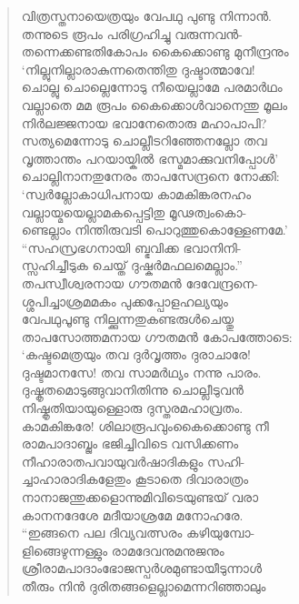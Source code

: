 \begin{verse}
വിത്രസ്തനായെത്രയും വേപഥു പുണ്ടു നിന്നാന്‍.\\
തന്നുടെ രൂപം പരിഗ്രഹിച്ചു വരുന്നവന്‍-\\
തന്നെക്കണ്ടതികോപം കൈക്കൊണ്ടു മുനീന്ദ്രനും\\
‘നില്ലുനില്ലാരാകുന്നതെന്തിതു ദുഷ്ടാത്മാവേ!\\
ചൊല്ലു ചൊല്ലെന്നോടു നീയെല്ലാമേ പരമാര്‍ഥം\\
വല്ലാതെ മമ രൂപം കൈക്കൊള്‍വാനെന്തു മൂലം\\
നിര്‍ലജ്ജനായ ഭവാനേതൊരു മഹാപാപി?\\
സത്യമെന്നോടു ചൊല്ലീടറിഞ്ഞേനല്ലോ തവ\\
വൃത്താന്തം പറയായ്കില്‍ ഭസ്മമാക്കുവനിപ്പോള്‍’\\
ചൊല്ലിനാനതുനേരം താപസേന്ദ്രനെ നോക്കി:\\
‘സ്വര്‍ല്ലോകാധിപനായ കാമകിങ്കരനഹം\\
വല്ലായ്മയെല്ലാമകപ്പെട്ടിതു മൂഢത്വംകൊ-\\
ണ്ടെല്ലാം നിന്തിരുവടി പൊറുത്തുകൊള്ളേണമേ.’\\
“സഹസ്രഭഗനായി ബ്ഭവിക്ക ഭവാനിനി-\\
സ്സഹിച്ചീടുക ചെയ്ത് ദുഷ്കര്‍മഫലമെല്ലാം.”\\
തപസ്വീശ്വരനായ ഗൗതമന്‍ ദേവേന്ദ്രനെ-\\
ശ്ശപിച്ചാശ്രമമകം പുക്കപ്പോളഹല്യയും\\
വേപഥുപൂണ്ടു നില്ക്കുന്നതുകണ്ടരുള്‍ചെയ്തു\\
താപസോത്തമനായ ഗൗതമന്‍ കോപത്തോടെ:\\
‘കഷ്ടമെത്രയും തവ ദുര്‍വൃത്തം ദുരാചാരേ!\\
ദുഷ്ടമാനസേ! തവ സാമര്‍ഥ്യം നന്നു പാരം.\\
ദുഷ്കൃതമൊടുങ്ങുവാനിതിന്നു ചൊല്ലീടുവന്‍\\
നിഷ്കൃതിയായുള്ളൊരു ദുസ്തരമഹാവ്രതം.\\
കാമകിങ്കരേ! ശിലാരൂപവുംകൈക്കൊണ്ടു നീ\\
രാമപാദാബ്ജം ഭജിച്ചിവിടെ വസിക്കണം\\
നീഹാരാതപവായുവര്‍ഷാദികളും സഹി-\\
ച്ചാഹാരാദികളേതും കൂടാതെ ദിവാരാത്രം\\
നാനാജന്തുക്കളൊന്നുമിവിടെയുണ്ടയ് വരാ\\
കാനനദേശേ മദീയാശ്രമേ മനോഹരേ.\\
“ഇങ്ങനെ പല ദിവ്യവത്സരം കഴിയുമ്പോ-\\
ളിങ്ങെഴുന്നള്ളും രാമദേവനുമനുജനും\\
ശ്രീരാമപാദാംഭോജസ്പര്‍ശമുണ്ടായീടുന്നാള്‍\\
തീരും നിന്‍ ദുരിതങ്ങളെല്ലാമെന്നറിഞ്ഞാലും\\

\end{verse}
